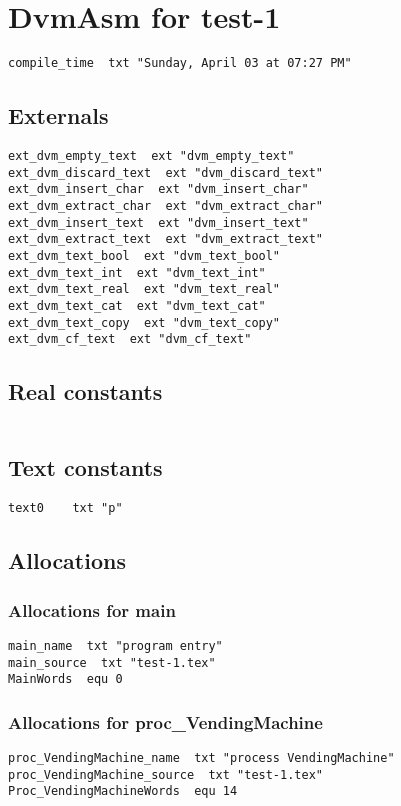 
\section{DvmAsm for test-1}
\begin{verbatim}
compile_time  txt "Sunday, April 03 at 07:27 PM"
\end{verbatim}

\subsection{Externals}
\begin{verbatim}
ext_dvm_empty_text  ext "dvm_empty_text"
ext_dvm_discard_text  ext "dvm_discard_text"
ext_dvm_insert_char  ext "dvm_insert_char"
ext_dvm_extract_char  ext "dvm_extract_char"
ext_dvm_insert_text  ext "dvm_insert_text"
ext_dvm_extract_text  ext "dvm_extract_text"
ext_dvm_text_bool  ext "dvm_text_bool"
ext_dvm_text_int  ext "dvm_text_int"
ext_dvm_text_real  ext "dvm_text_real"
ext_dvm_text_cat  ext "dvm_text_cat"
ext_dvm_text_copy  ext "dvm_text_copy"
ext_dvm_cf_text  ext "dvm_cf_text"
\end{verbatim}

\subsection{Real constants}
\begin{verbatim}
\end{verbatim}

\subsection{Text constants}
\begin{verbatim}
text0    txt "p"
\end{verbatim}

\subsection{Allocations}

\subsubsection{Allocations for main}
\begin{verbatim}
main_name  txt "program entry"
main_source  txt "test-1.tex"
MainWords  equ 0
\end{verbatim}

\subsubsection{Allocations for proc\_VendingMachine}
\begin{verbatim}
proc_VendingMachine_name  txt "process VendingMachine"
proc_VendingMachine_source  txt "test-1.tex"
Proc_VendingMachineWords  equ 14
\end{verbatim}

